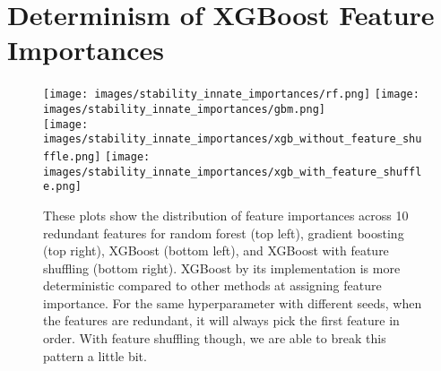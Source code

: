   
  
  
  
  \section{Determinism of XGBoost Feature Importances} \label{appendix:xgboost_deterministic}
 
  \begin{figure*}[h]
  \centering
  \texttt{[image: images/stability\_innate\_importances/rf.png]}
  \texttt{[image: images/stability\_innate\_importances/gbm.png]} \\
  \texttt{[image: images/stability\_innate\_importances/xgb\_without\_feature\_shuffle.png]}
  \texttt{[image: images/stability\_innate\_importances/xgb\_with\_feature\_shuffle.png]}
  
  \caption{These plots show the distribution of feature importances across 10 redundant features for random forest (top left), gradient boosting (top right), XGBoost (bottom left), and XGBoost with feature shuffling (bottom right). XGBoost by its implementation is more deterministic compared to other methods at assigning feature importance. For the same hyperparameter with different seeds, when the features are redundant, it will always pick the first feature in order. With feature shuffling though, we are able to break this pattern a little bit. }
  \label{fig:feature_imp_stability}
\end{figure*}

